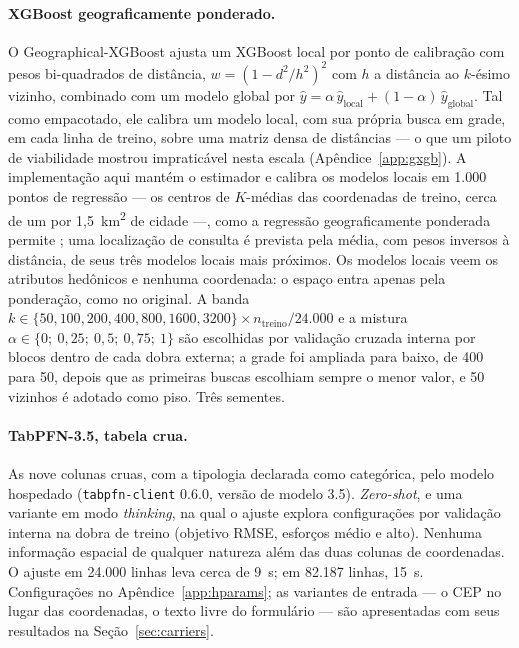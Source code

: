 \documentclass[11pt,a4paper]{article}
\begin{document}
\paragraph{XGBoost geograficamente ponderado.} O Geographical-XGBoost \citep{grekousis2025}
ajusta um XGBoost local por ponto de calibração com pesos bi-quadrados de distância,
$w = (1 - d^2/h^2)^2$ com $h$ a distância ao $k$-ésimo vizinho, combinado com um modelo global
por $\hat y = \alpha\,\hat y_{\text{local}} + (1 - \alpha)\,\hat y_{\text{global}}$. Tal como
empacotado, ele calibra um modelo local, com sua própria busca em grade, em cada linha de
treino, sobre uma matriz densa de distâncias --- o que um piloto de viabilidade mostrou
impraticável nesta escala (Apêndice~\ref{app:gxgb}). A implementação aqui mantém o estimador e
calibra os modelos locais em 1.000 pontos de regressão --- os centros de $K$-médias das
coordenadas de treino, cerca de um por 1,5~km\textsuperscript{2} de cidade ---, como a
regressão geograficamente ponderada permite \citep{fotheringham2002}; uma localização de
consulta é prevista pela média, com pesos inversos à distância, de seus três modelos locais
mais próximos. Os modelos locais veem os atributos hedônicos e nenhuma coordenada: o espaço
entra apenas pela ponderação, como no original. A banda
$k \in \{50, 100, 200, 400, 800, 1600, 3200\} \times n_{\text{treino}}/24.000$ e a mistura
$\alpha \in \{0;\ 0{,}25;\ 0{,}5;\ 0{,}75;\ 1\}$ são escolhidas por validação cruzada interna
por blocos dentro de cada dobra externa; a grade foi ampliada para baixo, de 400 para 50,
depois que as primeiras buscas escolhiam sempre o menor valor, e 50 vizinhos é adotado como
piso. Três sementes.

\paragraph{TabPFN-3.5, tabela crua.} As nove colunas cruas, com a tipologia declarada como
categórica, pelo modelo hospedado (\texttt{tabpfn-client} 0.6.0, versão de modelo 3.5).
\emph{Zero-shot}, e uma variante em modo \emph{thinking}, na qual o ajuste explora
configurações por validação interna na dobra de treino (objetivo RMSE, esforços médio e alto).
Nenhuma informação espacial de qualquer natureza além das duas colunas de coordenadas. O ajuste
em 24.000 linhas leva cerca de 9~s; em 82.187 linhas, 15~s. Configurações no
Apêndice~\ref{app:hparams}; as variantes de entrada --- o CEP no lugar das coordenadas, o texto
livre do formulário --- são apresentadas com seus resultados na Seção~\ref{sec:carriers}.
\end{document}
